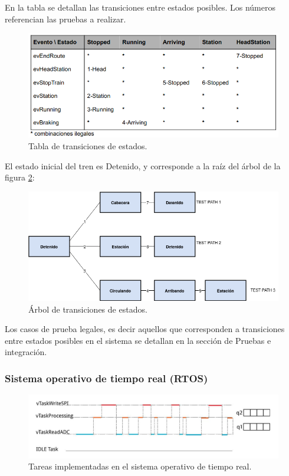 \documentclass[
11pt, %
]{charter}
\begin{document}
En la tabla se detallan las transiciones entre estados posibles. Los números referencian las pruebas a realizar.

\begin{figure}[htpb]
\centering 
\includegraphics[width=1\textwidth]{./Pics/TablaStatechart.1.png}
\caption{Tabla de transiciones de estados.}
\label{fig:State transition table}
\end{figure}

El estado inicial del tren es Detenido, y corresponde a la raíz del árbol de la figura \ref{fig:State tree}:

\begin{figure}[htpb]
\centering 
\includegraphics[width=1\textwidth]{./Pics/STT.Tree.png}
\caption{Árbol de transiciones de estados.}
\label{fig:State tree}
\end{figure}

Los casos de prueba legales, es decir aquellos que corresponden a
transiciones entre estados posibles en el sistema se detallan en la sección de Pruebas e integración.





\pagebreak
\subsubsection{Sistema operativo de tiempo real (RTOS)}

\begin{figure}[htpb]
\centering 
\includegraphics[width=1\textwidth]{./Pics/RTOS.tasks.png}
\caption{Tareas implementadas en el sistema operativo de tiempo real.}
\label{fig:RTOS tasks}
\end{figure}
\end{document}
